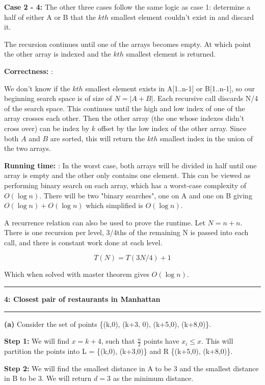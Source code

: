 \documentclass[11pt]{article}
\newcommand\question[2]{\vspace{.25in}\hrule\textbf{#1: #2}\vspace{.5em}\hrule\vspace{.10in}}
\renewcommand\part[1]{\vspace{.10in}\textbf{(#1)}}
\newcommand\correctness{\vspace{.10in}\textbf{Correctness: }}
\newcommand\runtime{\vspace{.10in}\textbf{Running time: }}
\begin{document}
\textbf{Case 2 - 4:} The other three cases follow the same logic as case 1: determine a half of either A or B that the $kth$ smallest element couldn't exist in and discard it.

The recursion continues until one of the arrays becomes empty. At which point the other array is indexed and the $kth$ smallest element is returned.

\correctness: 

We don't know if the $kth$ smallest element exists in A[1..n-1] or B[1..n-1], so our beginning search space is of size of $N = |A + B|$. Each recursive call discards N/4 of the search space. This continues until the high and low index of one of the array crosses each other. Then the other array (the one whose indexes didn't cross over) can be index by $k$ offset by the low index of the other array. Since both $A$ and $B$ are sorted, this will return the $kth$ smallest index in the union of the two arrays.

\runtime: In the worst case, both arrays will be divided in half until one array is empty and the other only contains one element. This can be viewed as performing binary search on each array, which has a worst-case complexity of $O(\log n)$. There will be two "binary searches", one on A and one on B giving $O(\log n) + O(\log n)$ which simplified is $O(\log n)$. 

	A recurrence relation can also be used to prove the runtime. Let $N = n + n$. There is one recursion per level, 3/4ths of the remaining N is passed into each call, and there is constant work done at each level.
	
	$$T(N) = T(3N/4) + 1$$
	
	Which when solved with master theorem gives $O(\log n)$.
	

\question{4}{Closest pair of restaurants in Manhattan}

\part{a} Consider the set of points \{(k,0), (k+3, 0), (k+5,0), (k+8,0)\}.

\textbf{Step 1:} We will find $x=k+4$, such that $\frac{n}{2}$ points have $x_i \leq x$. This will partition the points into \newline L = \{(k,0), (k+3,0)\} and R \{(k+5,0), (k+8,0)\}.

\textbf{Step 2:} We will find the smallest distance in A to be 3 and the smallest distance in B to be 3. We will return $d = 3$ as the minimum distance.
\end{document}
